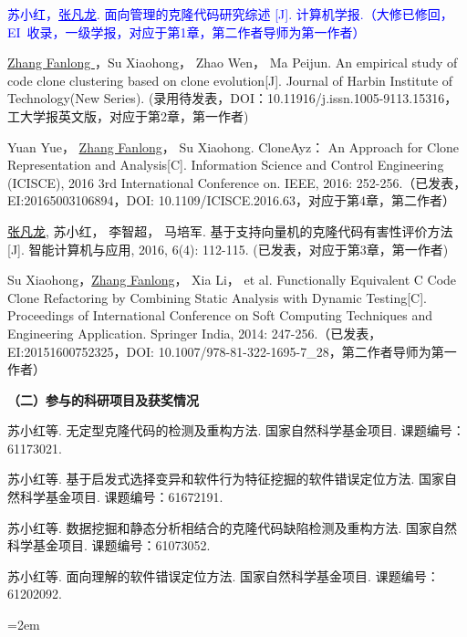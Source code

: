 \begin{publist}
\item 
\textcolor{blue}{苏小红，\underline{张凡龙}. 面向管理的克隆代码研究综述 [J]. 计算机学报.（大修已修回，EI~收录，一级学报，对应于第1章，第二作者导师为第一作者）}
\item
\underline{Zhang Fanlong }，Su Xiaohong， Zhao Wen， Ma Peijun. An empirical study of code clone clustering based on clone evolution[J]. Journal of Harbin Institute of Technology(New Series). (录用待发表，DOI：10.11916/j.issn.1005-9113.15316，工大学报英文版，对应于第2章，第一作者)

\item
Yuan Yue， \underline{Zhang Fanlong}， Su Xiaohong. CloneAyz： An Approach for Clone Representation and Analysis[C]. Information Science and Control Engineering (ICISCE), 2016 3rd International Conference on. IEEE, 2016: 252-256.（已发表，EI:20165003106894，DOI:	10.1109/ICISCE.2016.63，对应于第4章，第二作者）
\item
\item
\underline{张凡龙}, 苏小红， 李智超， 马培军. 基于支持向量机的克隆代码有害性评价方法[J]. 智能计算机与应用, 2016, 6(4): 112-115. (已发表，对应于第3章，第一作者)

\item
Su Xiaohong，\underline{Zhang Fanlong}， Xia Li， et al. Functionally Equivalent C Code Clone Refactoring by Combining Static Analysis with Dynamic Testing[C]. Proceedings of International Conference on Soft Computing Techniques and Engineering Application. Springer India, 2014: 247-256.（已发表，EI:20151600752325，DOI: 10.1007/978-81-322-1695-7\_28，第二作者导师为第一作者）
\end{publist}




\noindent\textbf{（二）参与的科研项目及获奖情况}
\begin{publist}
\item	
苏小红等. 无定型克隆代码的检测及重构方法. 国家自然科学基金项目. 课题编号：61173021.
\item 
苏小红等. 基于启发式选择变异和软件行为特征挖掘的软件错误定位方法. 国家自然科学基金项目. 课题编号：61672191.
\item
苏小红等. 数据挖掘和静态分析相结合的克隆代码缺陷检测及重构方法. 国家自然科学基金项目. 课题编号：61073052.
\item
苏小红等. 面向理解的软件错误定位方法. 国家自然科学基金项目. 课题编号：61202092.

\end{publist}
\vfill
{}\hangindent=2em\noindent

\setlength{\parindent}{2em}
